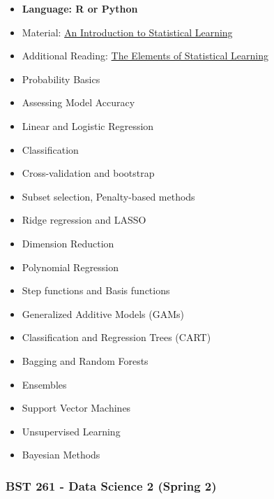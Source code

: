 \documentclass[
]{article}
\providecommand{\tightlist}{%
  \setlength{\itemsep}{0pt}\setlength{\parskip}{0pt}}
\begin{document}
\begin{itemize}
\tightlist
\item
  \textbf{Language: R or Python}
\item
  Material: \href{https://www.statlearning.com/}{An Introduction to
  Statistical Learning}
\item
  Additional Reading:
  \href{https://web.stanford.edu/~hastie/Papers/ESLII.pdf}{The Elements
  of Statistical Learning}
\item
  Probability Basics
\item
  Assessing Model Accuracy
\item
  Linear and Logistic Regression
\item
  Classification
\item
  Cross-validation and bootstrap
\item
  Subset selection, Penalty-based methods
\item
  Ridge regression and LASSO
\item
  Dimension Reduction
\item
  Polynomial Regression
\item
  Step functions and Basis functions
\item
  Generalized Additive Models (GAMs)
\item
  Classification and Regression Trees (CART)
\item
  Bagging and Random Forests
\item
  Ensembles
\item
  Support Vector Machines
\item
  Unsupervised Learning
\item
  Bayesian Methods
\end{itemize}

\hypertarget{bst-261---data-science-2-spring-2}{%
\subsubsection{BST 261 - Data Science 2 (Spring
2)}\label{bst-261---data-science-2-spring-2}}
\end{document}
